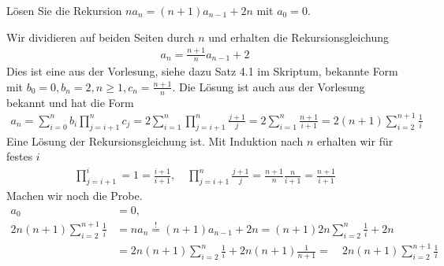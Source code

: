 
\begin{exercise}

	Lösen Sie die Rekursion $n a_n = (n + 1) a_{n - 1} + 2n$ mit $a_0 = 0$.

\end{exercise}


\begin{solution}

	Wir dividieren auf beiden Seiten durch $n$ und erhalten die Rekursionsgleichung
	\begin{align*}
	a_n = \frac{n + 1}{n} a_{n - 1} + 2
	\end{align*}
	Dies ist eine aus der Vorlesung, siehe dazu Satz 4.1 im Skriptum, bekannte Form mit $b_0 = 0, b_n = 2, n \geq 1, c_n = \frac{n+1}{n}$. Die Lösung ist auch aus der Vorlesung bekannt und hat die Form
	\begin{align*}
	a_n = \sum_{i=0}^nb_i\prod_{j=i+1}^nc_j
	= 2\sum_{i=1}^n\prod_{j=i+1}^n\frac{j+1}{j} = 2\sum_{i=1}^n\frac{n+1}{i+1}
	= 2(n+1)\sum_{i=2}^{n+1}\frac{1}{i}
	\end{align*}
	Eine Lösung der Rekursionsgleichung ist. Mit Induktion nach $n$ erhalten wir für festes $i$
	\begin{align*}
	\prod_{j=i+1}^i = 1 = \frac{i + 1}{i + 1}, \quad \prod_{j = i+1}^{n} \frac{j + 1}{j} =
	\frac{n + 1}{n} \frac{n}{i + 1} = \frac{n + 1}{i + 1}
	\end{align*}
	Machen wir noch die Probe.
	\begin{align*}
	a_0 &= 0, \\
	2n(n + 1) \sum_{i = 2}^{n + 1} \frac{1}{i} &= n a_n \stackrel{!}{=} (n + 1) a_{n - 1} + 2n = (n + 1) 2n \sum_{i = 2}^{n} \frac{1}{i} + 2n \\
	&= 2n (n + 1)  \sum_{i = 2}^{n} \frac{1}{i} + 2n (n + 1) \frac{1}{n + 1} = \quad 2n(n + 1) \sum_{i = 2}^{n + 1} \frac{1}{i}
	\end{align*}
\end{solution}

